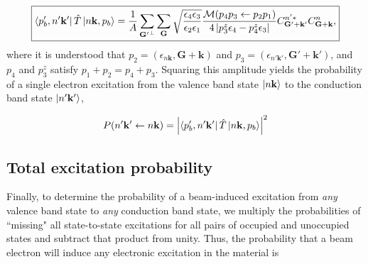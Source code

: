 \documentclass{article}
\begin{document}
\begin{equation}
\label{eq:ampCode}
\begin{aligned}
\boxed{
    \bra{p'_b, n'\mathbf{k'}} \hat{T} \ket{n\mathbf{k},p_b}
    =
    \frac{1}{A}
    \sum_{\mathbf{G'}^\perp} \sum_{\mathbf{G}}
    \sqrt{\frac{\epsilon_4\epsilon_3}{\epsilon_2\epsilon_1}}
    \frac{\mathcal{M}(p_4p_3\leftarrow p_2p_1)}
    {4\left|p_3^z\epsilon_4 - p_4^z\epsilon_3\right|}
    C_{\mathbf{G'+k'}}^{n'\ast} C_{\mathbf{G+k}}^{n},
    }
\end{aligned}
\end{equation}
%
where it is understood that
$p_2 = (\epsilon_{n\mathbf{k}}, \mathbf{G+k})$
and
$p_3 = (\epsilon_{n'\mathbf{k'}}, \mathbf{G'+k'})$,
%
and $p_4$ and $p_3^z$ satisfy $p_1 + p_2 = p_4 + p_3$.
Squaring this amplitude yields the probability of a single electron excitation from the valence band state $\ket{n\mathbf{k}}$ to the conduction band state $\ket{n'\mathbf{k'}}$,

\begin{equation}
    P(n'\mathbf{k'}\leftarrow n\mathbf{k})
    =
    \left|
    \bra{p'_b, n'\mathbf{k'}} \hat{T} \ket{n\mathbf{k},p_b}
    \right|^2
\end{equation}
%

\subsection{Total excitation probability}
\label{sec:tot}

Finally, to determine the probability of a beam-induced excitation from \textit{any} valence band state to \textit{any} conduction band state, we multiply the probabilities of ``missing" all state-to-state excitations for all pairs of occupied and unoccupied states and subtract that product from unity.  Thus, the probability that a beam electron will induce any electronic excitation in the material is
\end{document}
